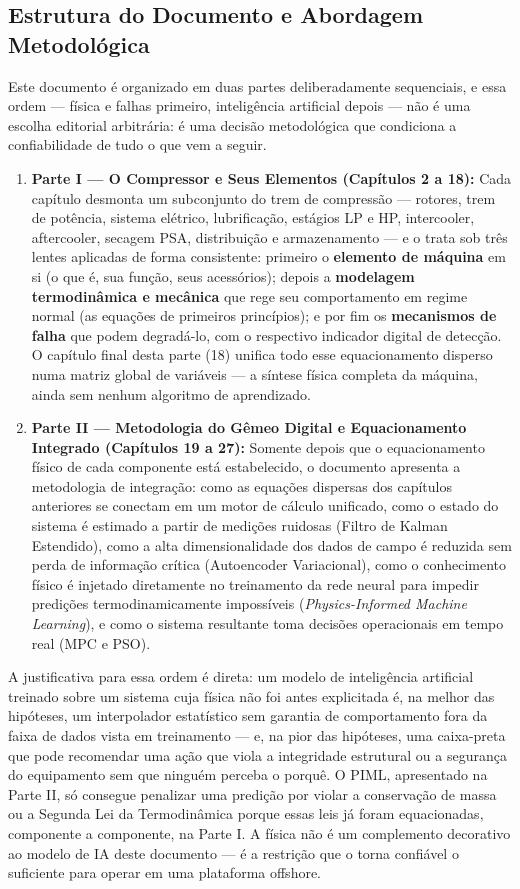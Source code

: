 \documentclass[12pt,a4paper]{article}
\numberwithin{equation}{section}
\numberwithin{table}{section}
\numberwithin{figure}{section}
\begin{document}
	\subsection{\textbf{Estrutura do Documento e Abordagem Metodológica}}
	Este documento é organizado em duas partes deliberadamente sequenciais, e essa ordem — física e falhas primeiro, inteligência artificial depois — não é uma escolha editorial arbitrária: é uma decisão metodológica que condiciona a confiabilidade de tudo o que vem a seguir.

	\begin{enumerate}
		\item \textbf{Parte I — O Compressor e Seus Elementos (Capítulos 2 a 18):} Cada capítulo desmonta um subconjunto do trem de compressão — rotores, trem de potência, sistema elétrico, lubrificação, estágios LP e HP, intercooler, aftercooler, secagem PSA, distribuição e armazenamento — e o trata sob três lentes aplicadas de forma consistente: primeiro o \textbf{elemento de máquina} em si (o que é, sua função, seus acessórios); depois a \textbf{modelagem termodinâmica e mecânica} que rege seu comportamento em regime normal (as equações de primeiros princípios); e por fim os \textbf{mecanismos de falha} que podem degradá-lo, com o respectivo indicador digital de detecção. O capítulo final desta parte (18) unifica todo esse equacionamento disperso numa matriz global de variáveis — a síntese física completa da máquina, ainda sem nenhum algoritmo de aprendizado.
		\item \textbf{Parte II — Metodologia do Gêmeo Digital e Equacionamento Integrado (Capítulos 19 a 27):} Somente depois que o equacionamento físico de cada componente está estabelecido, o documento apresenta a metodologia de integração: como as equações dispersas dos capítulos anteriores se conectam em um motor de cálculo unificado, como o estado do sistema é estimado a partir de medições ruidosas (Filtro de Kalman Estendido), como a alta dimensionalidade dos dados de campo é reduzida sem perda de informação crítica (Autoencoder Variacional), como o conhecimento físico é injetado diretamente no treinamento da rede neural para impedir predições termodinamicamente impossíveis (\textit{Physics-Informed Machine Learning}), e como o sistema resultante toma decisões operacionais em tempo real (MPC e PSO).
	\end{enumerate}

	A justificativa para essa ordem é direta: um modelo de inteligência artificial treinado sobre um sistema cuja física não foi antes explicitada é, na melhor das hipóteses, um interpolador estatístico sem garantia de comportamento fora da faixa de dados vista em treinamento — e, na pior das hipóteses, uma caixa-preta que pode recomendar uma ação que viola a integridade estrutural ou a segurança do equipamento sem que ninguém perceba o porquê. O PIML, apresentado na Parte II, só consegue penalizar uma predição por violar a conservação de massa ou a Segunda Lei da Termodinâmica porque essas leis já foram equacionadas, componente a componente, na Parte I. A física não é um complemento decorativo ao modelo de IA deste documento — é a restrição que o torna confiável o suficiente para operar em uma plataforma offshore.
\end{document}
